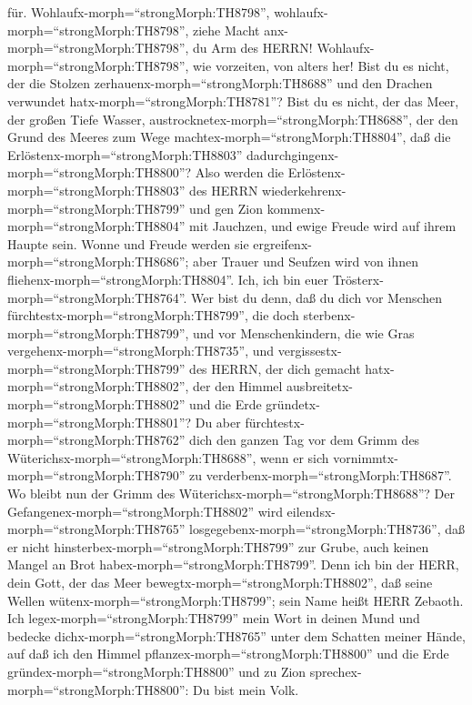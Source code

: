 für.  Wohlaufx-morph=``strongMorph:TH8798'',
wohlaufx-morph=``strongMorph:TH8798'', ziehe Macht
anx-morph=``strongMorph:TH8798'', du Arm des HERRN!
Wohlaufx-morph=``strongMorph:TH8798'', wie vorzeiten, von alters her!
Bist du es nicht, der die Stolzen zerhauenx-morph=``strongMorph:TH8688''
und den Drachen verwundet hatx-morph=``strongMorph:TH8781''?
 Bist du es nicht, der das Meer, der großen Tiefe Wasser,
austrocknetex-morph=``strongMorph:TH8688'', der den Grund des Meeres zum
Wege machtex-morph=``strongMorph:TH8804'', daß die
Erlöstenx-morph=``strongMorph:TH8803''
dadurchgingenx-morph=``strongMorph:TH8800''?  Also werden
die Erlöstenx-morph=``strongMorph:TH8803'' des HERRN
wiederkehrenx-morph=``strongMorph:TH8799'' und gen Zion
kommenx-morph=``strongMorph:TH8804'' mit Jauchzen, und ewige Freude wird
auf ihrem Haupte sein. Wonne und Freude werden sie
ergreifenx-morph=``strongMorph:TH8686''; aber Trauer und Seufzen wird
von ihnen fliehenx-morph=``strongMorph:TH8804''.  Ich, ich
bin euer Trösterx-morph=``strongMorph:TH8764''. Wer bist du denn, daß du
dich vor Menschen fürchtestx-morph=``strongMorph:TH8799'', die doch
sterbenx-morph=``strongMorph:TH8799'', und vor Menschenkindern, die wie
Gras vergehenx-morph=``strongMorph:TH8735'',  und
vergissestx-morph=``strongMorph:TH8799'' des HERRN, der dich gemacht
hatx-morph=``strongMorph:TH8802'', der den Himmel
ausbreitetx-morph=``strongMorph:TH8802'' und die Erde
gründetx-morph=``strongMorph:TH8801''? Du aber
fürchtestx-morph=``strongMorph:TH8762'' dich den ganzen Tag vor dem
Grimm des Wüterichsx-morph=``strongMorph:TH8688'', wenn er sich
vornimmtx-morph=``strongMorph:TH8790'' zu
verderbenx-morph=``strongMorph:TH8687''. Wo bleibt nun der Grimm des
Wüterichsx-morph=``strongMorph:TH8688''?  Der
Gefangenex-morph=``strongMorph:TH8802'' wird
eilendsx-morph=``strongMorph:TH8765''
losgegebenx-morph=``strongMorph:TH8736'', daß er nicht
hinsterbex-morph=``strongMorph:TH8799'' zur Grube, auch keinen Mangel an
Brot habex-morph=``strongMorph:TH8799''.  Denn ich bin der
HERR, dein Gott, der das Meer bewegtx-morph=``strongMorph:TH8802'', daß
seine Wellen wütenx-morph=``strongMorph:TH8799''; sein Name heißt HERR
Zebaoth.  Ich legex-morph=``strongMorph:TH8799'' mein Wort
in deinen Mund und bedecke dichx-morph=``strongMorph:TH8765'' unter dem
Schatten meiner Hände, auf daß ich den Himmel
pflanzex-morph=``strongMorph:TH8800'' und die Erde
gründex-morph=``strongMorph:TH8800'' und zu Zion
sprechex-morph=``strongMorph:TH8800'': Du bist mein Volk. 
